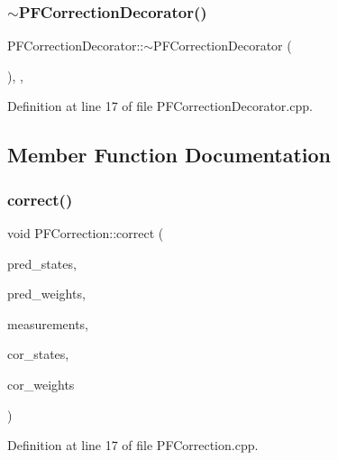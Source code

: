 \subsubsection{\texorpdfstring{$\sim$\+P\+F\+Correction\+Decorator()}{~PFCorrectionDecorator()}}
{\footnotesize\ttfamily P\+F\+Correction\+Decorator\+::$\sim$\+P\+F\+Correction\+Decorator (\begin{DoxyParamCaption}{ }\end{DoxyParamCaption})\hspace{0.3cm}{\ttfamily [protected]}, {\ttfamily [virtual]}, {\ttfamily [noexcept]}}



Definition at line 17 of file P\+F\+Correction\+Decorator.\+cpp.



\subsection{Member Function Documentation}
\mbox{\label{classbfl_1_1PFCorrection_a7d8e7f910fe5ebcb7d8ed678c6f38836}} 
\subsubsection{\texorpdfstring{correct()}{correct()}}
{\footnotesize\ttfamily void P\+F\+Correction\+::correct (\begin{DoxyParamCaption}\item[{const Eigen\+::\+Ref$<$ const Eigen\+::\+Matrix\+Xf $>$ \&}]{pred\+\_\+states,  }\item[{const Eigen\+::\+Ref$<$ const Eigen\+::\+Vector\+Xf $>$ \&}]{pred\+\_\+weights,  }\item[{const Eigen\+::\+Ref$<$ const Eigen\+::\+Matrix\+Xf $>$ \&}]{measurements,  }\item[{Eigen\+::\+Ref$<$ Eigen\+::\+Matrix\+Xf $>$}]{cor\+\_\+states,  }\item[{Eigen\+::\+Ref$<$ Eigen\+::\+Vector\+Xf $>$}]{cor\+\_\+weights }\end{DoxyParamCaption})\hspace{0.3cm}{\ttfamily [inherited]}}



Definition at line 17 of file P\+F\+Correction.\+cpp.

